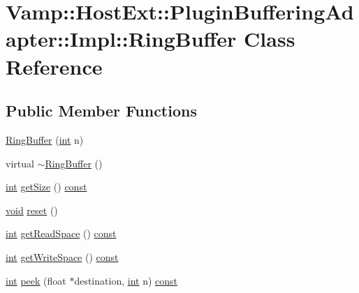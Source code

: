 \hypertarget{class_vamp_1_1_host_ext_1_1_plugin_buffering_adapter_1_1_impl_1_1_ring_buffer}{}\section{Vamp\+:\+:Host\+Ext\+:\+:Plugin\+Buffering\+Adapter\+:\+:Impl\+:\+:Ring\+Buffer Class Reference}
\label{class_vamp_1_1_host_ext_1_1_plugin_buffering_adapter_1_1_impl_1_1_ring_buffer}
\subsection*{Public Member Functions}
\begin{DoxyCompactItemize}
\item 
\hyperlink{class_vamp_1_1_host_ext_1_1_plugin_buffering_adapter_1_1_impl_1_1_ring_buffer_a3ee5e4cfee66645629063b1db5cffa96}{Ring\+Buffer} (\hyperlink{xmltok_8h_a5a0d4a5641ce434f1d23533f2b2e6653}{int} n)
\item 
virtual \hyperlink{class_vamp_1_1_host_ext_1_1_plugin_buffering_adapter_1_1_impl_1_1_ring_buffer_af1e12002a506cc1433793e7b93e73b80}{$\sim$\+Ring\+Buffer} ()
\item 
\hyperlink{xmltok_8h_a5a0d4a5641ce434f1d23533f2b2e6653}{int} \hyperlink{class_vamp_1_1_host_ext_1_1_plugin_buffering_adapter_1_1_impl_1_1_ring_buffer_a205516271035fef2e94bb1af17b6c47d}{get\+Size} () \hyperlink{getopt1_8c_a2c212835823e3c54a8ab6d95c652660e}{const} 
\item 
\hyperlink{sound_8c_ae35f5844602719cf66324f4de2a658b3}{void} \hyperlink{class_vamp_1_1_host_ext_1_1_plugin_buffering_adapter_1_1_impl_1_1_ring_buffer_ac3eba9efa4b5bdb4bfa9907ad9203fe1}{reset} ()
\item 
\hyperlink{xmltok_8h_a5a0d4a5641ce434f1d23533f2b2e6653}{int} \hyperlink{class_vamp_1_1_host_ext_1_1_plugin_buffering_adapter_1_1_impl_1_1_ring_buffer_a830be6afbe2b46f0c9cd6071cf287cf8}{get\+Read\+Space} () \hyperlink{getopt1_8c_a2c212835823e3c54a8ab6d95c652660e}{const} 
\item 
\hyperlink{xmltok_8h_a5a0d4a5641ce434f1d23533f2b2e6653}{int} \hyperlink{class_vamp_1_1_host_ext_1_1_plugin_buffering_adapter_1_1_impl_1_1_ring_buffer_af9edfe7748168802019429af240bcc74}{get\+Write\+Space} () \hyperlink{getopt1_8c_a2c212835823e3c54a8ab6d95c652660e}{const} 
\item 
\hyperlink{xmltok_8h_a5a0d4a5641ce434f1d23533f2b2e6653}{int} \hyperlink{class_vamp_1_1_host_ext_1_1_plugin_buffering_adapter_1_1_impl_1_1_ring_buffer_ac68e9b2b24e1ac17f017c80ade70b355}{peek} (float $\ast$destination, \hyperlink{xmltok_8h_a5a0d4a5641ce434f1d23533f2b2e6653}{int} n) \hyperlink{getopt1_8c_a2c212835823e3c54a8ab6d95c652660e}{const} 

\end{DoxyCompactItemize}

